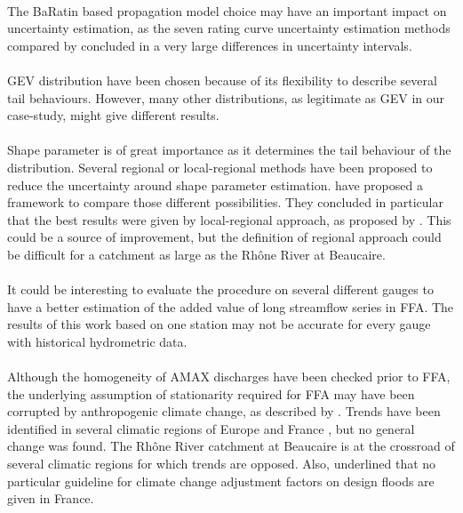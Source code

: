 \documentclass[11pt]{article}
\begin{document}
    \paragraph{}
    The BaRatin \citep{lecoz_quantification_2014} based propagation model choice may have an important impact on uncertainty estimation, as the seven rating curve uncertainty estimation methods compared by \citet{kiang_comparison_2018} concluded in a very large differences in uncertainty intervals.
    \paragraph{}
    GEV distribution have been chosen because of its flexibility to describe several tail behaviours. However, many other distributions, as legitimate as GEV in our case-study, might give different results. 
    \paragraph{}
    Shape parameter is of great importance as it determines the tail behaviour of the distribution. Several regional or local-regional methods have been proposed to reduce the uncertainty around shape parameter estimation. \citet{renard_data-based_2013} have proposed a framework to compare those different possibilities. They concluded in particular that the best results were given by local-regional approach, as proposed by \citet{ribatet_regional_2007}. This could be a source of improvement, but the definition of regional approach could be difficult for a catchment as large as the Rhône River at Beaucaire.
    \paragraph{}
    It could be interesting to evaluate the procedure on several different gauges to have a better estimation of the added value of long streamflow series in FFA. The results of this work based on one station may not be accurate for every gauge with historical hydrometric data.  
    \paragraph{}
    Although the homogeneity of AMAX discharges have been checked prior to FFA, the underlying assumption of stationarity required for FFA may have been corrupted by anthropogenic climate change, as described by \citet{milly_stationarity_2008}. Trends have been identified in several climatic regions of Europe \citep{hall_understanding_2014} and France \citep{renard_regional_2008}, but no general change was found. The Rhône River catchment at Beaucaire is at the crossroad of several climatic regions for which trends are opposed. Also, \citet{madsen_review_2014} underlined that no particular guideline for climate change adjustment factors on design floods are given in France.
\end{document}
